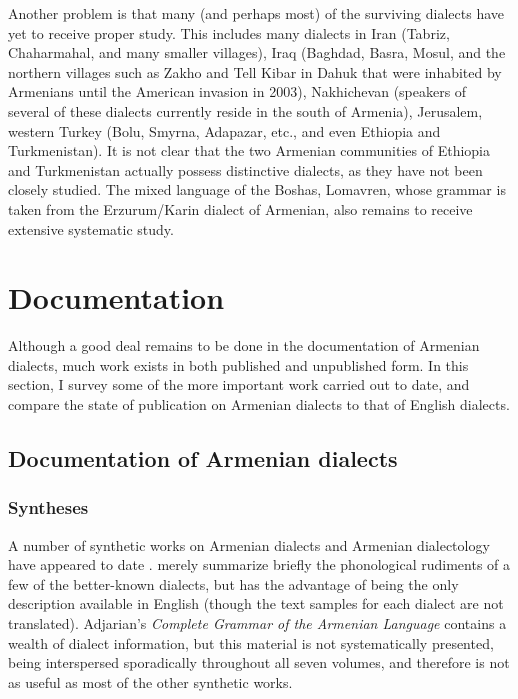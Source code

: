 \documentclass[output=paper]{langscibook}
\begin{document}
Another problem is that many (and perhaps most) of the surviving dialects have yet to receive proper study. This includes many dialects in Iran (Tabriz, Chaharmahal, and many smaller villages), Iraq (Baghdad, Basra, Mosul, and the northern villages such as Zakho and Tell Kibar in Dahuk  that were inhabited by Armenians until the American invasion in 2003), Nakhichevan (speakers of several of these dialects currently reside in the south of Armenia), Jerusalem, western Turkey (Bolu, Smyrna, Adapazar, etc., and even Ethiopia and Turkmenistan).  It is not clear that the   two Armenian communities of Ethiopia and Turkmenistan actually possess distinctive dialects, as they have not been closely studied.  The mixed language of the Boshas, Lomavren, whose grammar is taken from the Erzurum/Karin dialect of Armenian, also remains to receive extensive systematic study.

\section{Documentation }\label{sec:vaux:documentation}
Although a good deal remains to be done in the documentation of Armenian dialects, much work exists in both published and unpublished form. In this section, I survey some of the more important work carried out to date, and compare the state of publication on Armenian dialects to that of English dialects.


\subsection{ Documentation of Armenian dialects}\label{sec:vaux:documentation:arm}

\subsubsection{Syntheses}\label{sec:vaux:documentation:arm:syn}

A number of synthetic works on Armenian dialects and Armenian dialectology have appeared to date \citep{Patkanian-1869-RussianDialects,Adjarian-1909-ClassificationArmenianDialect,Adjarian-1911-DialectologyBook,Gharibyan-1953-ArmenianDialectology,Gharibyan-1958-SyriaArmenianNewDiscovered,Grigoryan-1957-ArmenianDialectologyCourse,Jahukyan-1972-ArmenianDiaolectology,Asatryan-1985-ManualArmenianDialectology,GreppinKhachaturian-1986-HandbookArmenianDialectology}. \citet{GreppinKhachaturian-1986-HandbookArmenianDialectology} merely summarize briefly the phonological rudiments of a few of the better-known dialects, but has the advantage of being the only description available in English (though the text samples for each dialect are not translated).   Adjarian's \textit{Complete Grammar of the Armenian Language}  \citep{Adjarian-1952-Liakatar1AdjNumeral,Adjarian-1954-Liakatar2,Adjarian-1955-Liakatar0,Adjarian-1957-Liakatar3,Adjarian-1965-Liakatar5,Adjarian-1971-Liakatar6Phono,Adjarian-1959-Liakatar4Book1Verb,Adjarian-1961-Liakatar4Book2Conj} contains a wealth of dialect information, but this material is not systematically presented, being interspersed sporadically throughout all seven volumes, and therefore is not as useful as most of the other synthetic works.
\end{document}
